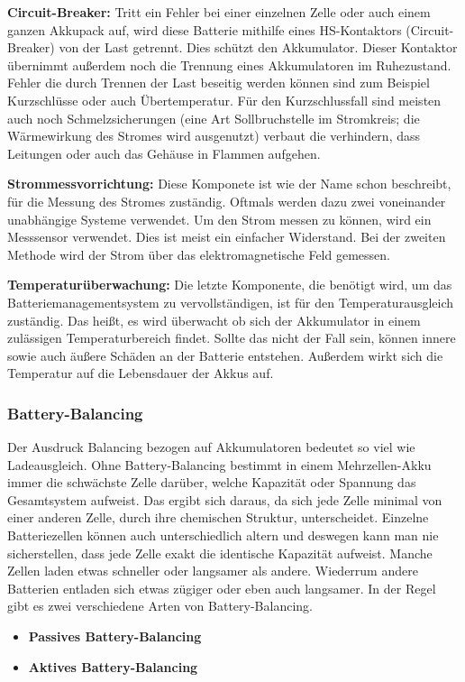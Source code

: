 \textbf{Circuit-Breaker:}
Tritt ein Fehler bei einer einzelnen Zelle oder auch einem ganzen Akkupack auf, wird diese Batterie mithilfe eines HS-Kontaktors (Circuit-Breaker) von der Last getrennt. Dies schützt den Akkumulator. Dieser Kontaktor übernimmt außerdem noch die Trennung eines Akkumulatoren im Ruhezustand. Fehler die durch Trennen der Last beseitig werden können sind zum Beispiel Kurzschlüsse oder auch Übertemperatur. Für den Kurzschlussfall sind meisten auch noch Schmelzsicherungen (eine Art Sollbruchstelle im Stromkreis; die Wärmewirkung des Stromes wird ausgenutzt) verbaut die verhindern, dass Leitungen oder auch das Gehäuse in Flammen aufgehen.

\textbf{Strommessvorrichtung:}
Diese Komponete ist wie der Name schon beschreibt, für die Messung des Stromes zuständig. Oftmals werden dazu zwei voneinander unabhängige Systeme verwendet. Um den Strom messen zu können, wird ein Messsensor verwendet. Dies ist meist ein einfacher Widerstand. Bei der zweiten Methode wird der Strom über das elektromagnetische Feld gemessen.

\textbf{Temperaturüberwachung:}
Die letzte Komponente, die benötigt wird, um das Batteriemanagementsystem zu vervollständigen, ist für den Temperaturausgleich zuständig. Das heißt, es wird überwacht ob sich der Akkumulator in einem zulässigen Temperaturbereich findet. Sollte das nicht der Fall sein, können innere sowie auch äußere Schäden an der Batterie entstehen. Außerdem wirkt sich die Temperatur auf die Lebensdauer der Akkus auf.
\newpage

\subsubsection{Battery-Balancing}
\label{Battery-Balancing}
Der Ausdruck Balancing bezogen auf Akkumulatoren bedeutet so viel wie Ladeausgleich. Ohne Battery-Balancing bestimmt in einem Mehrzellen-Akku immer die schwächste Zelle darüber, welche Kapazität oder Spannung das Gesamtsystem aufweist. Das ergibt sich daraus, da sich jede Zelle minimal von einer anderen Zelle, durch ihre chemischen Struktur, unterscheidet. Einzelne Batteriezellen können auch unterschiedlich altern und deswegen kann man nie sicherstellen, dass jede Zelle exakt die identische Kapazität aufweist. Manche Zellen laden etwas schneller oder langsamer als andere. Wiederrum andere Batterien entladen sich etwas zügiger oder eben auch langsamer. In der Regel gibt es zwei verschiedene Arten von Battery-Balancing.
\begin{itemize}
\item \textbf{Passives Battery-Balancing} \medskip\\
\item \textbf{Aktives Battery-Balancing} \medskip\\
\end{itemize}


